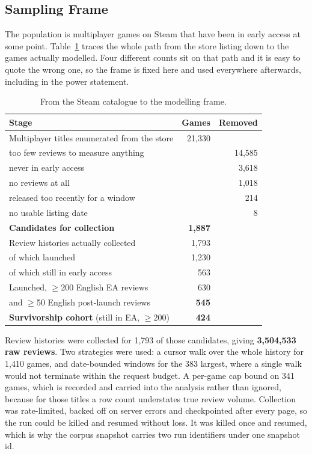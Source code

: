 \documentclass[sigconf]{acmart}
\begin{document}
\subsection{Sampling Frame}
\label{sec:dataFrame}

The population is multiplayer games on Steam that have been in early access at some point.
Table~\ref{tab:funnel} traces the whole path from the store listing down to the games actually
modelled. Four different counts sit on that path and it is easy to quote the wrong one, so the
frame is fixed here and used everywhere afterwards, including in the power statement.

\begin{table}[t]
\centering
\caption{From the Steam catalogue to the modelling frame.}
\label{tab:funnel}
\footnotesize
\begin{tabular}{@{}p{5.1cm}rr@{}}
\toprule
\textbf{Stage} & \textbf{Games} & \textbf{Removed} \\
\midrule
Multiplayer titles enumerated from the store & 21,330 & \\
\quad too few reviews to measure anything & & 14,585 \\
\quad never in early access & & 3,618 \\
\quad no reviews at all & & 1,018 \\
\quad released too recently for a window & & 214 \\
\quad no usable listing date & & 8 \\
\midrule
\textbf{Candidates for collection} & \textbf{1,887} & \\
Review histories actually collected & 1,793 & \\
\quad of which launched & 1,230 & \\
\quad of which still in early access & 563 & \\
\midrule
Launched, $\geq$200 English EA reviews & 630 & \\
\quad and $\geq$50 English post-launch reviews & \textbf{545} & \\
\textbf{Survivorship cohort} (still in EA, $\geq$200) & \textbf{424} & \\
\bottomrule
\end{tabular}
\end{table}

Review histories were collected for 1,793 of those candidates, giving \textbf{3,504,533 raw
reviews}. Two strategies were used: a cursor walk over the whole history for 1,410 games, and
date-bounded windows for the 383 largest, where a single walk would not terminate within the
request budget. A per-game cap bound on 341 games, which is recorded and carried into the analysis
rather than ignored, because for those titles a row count understates true review volume.
Collection was rate-limited, backed off on server errors and checkpointed after every page, so the
run could be killed and resumed without loss. It was killed once and resumed, which is why the
corpus snapshot carries two run identifiers under one snapshot id.
\end{document}
